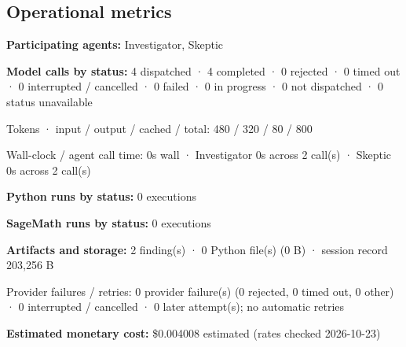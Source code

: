 \documentclass[11pt]{article}
\begin{document}
\subsection{Operational metrics}
\textbf{Participating agents:} Investigator, Skeptic\par
\textbf{Model calls by status:} 4 dispatched · 4 completed · 0 rejected · 0 timed out · 0 interrupted / cancelled · 0 failed · 0 in progress · 0 not dispatched · 0 status unavailable\par
Tokens · input / output / cached / total: 480 / 320 / 80 / 800\par
Wall-clock / agent call time: 0s wall · Investigator 0s across 2 call(s) · Skeptic 0s across 2 call(s)\par
\textbf{Python runs by status:} 0 executions\par
\textbf{SageMath runs by status:} 0 executions\par
\textbf{Artifacts and storage:} 2 finding(s) · 0 Python file(s) (0 B) · session record 203,256 B\par
Provider failures / retries: 0 provider failure(s) (0 rejected, 0 timed out, 0 other) · 0 interrupted / cancelled · 0 later attempt(s); no automatic retries\par
\textbf{Estimated monetary cost:} \$0.004008 estimated (rates checked 2026-10-23)\par
\end{document}
